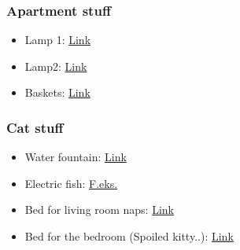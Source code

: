 \documentclass[a4paper,12pt]{article}
\begin{document}
\subsubsection*{Apartment stuff}
\begin{itemize}
		\item Lamp 1: \href{https://www.amazon.de/-/en/dp/B06XGC4VF3/?coliid=I6H4RCOZ197G3&colid=I0FEDY0421U1&psc=1&ref_=lv_ov_lig_dp_it&fbclid=IwAR24RCNj0vZ2K4CFiniVLbQ6P-MuHoh9wmFvzXI8M5NcRrYsdjoWFRuJbIg}{Link}
		\item Lamp2:  \href{https://www.amazon.de/-/en/dp/B07ML3DQ13/?coliid=I3D74LQJIHFMZ9&colid=I0FEDY0421U1&psc=1&ref_=lv_ov_lig_dp_it&fbclid=IwAR1Z52swpR9e4hBIBU0YJEnDChVSxL1xAadWj90BVkDkGgM3YDGkT8u4D8I}{Link}
		\item Baskets: \href{https://www.amazon.de/-/en/dp/B07C887FYQ/?coliid=I1R9F26MKG66DZ&colid=I0FEDY0421U1&psc=1&ref_=lv_ov_lig_dp_it&fbclid=IwAR2iJwflYhNP7ArrfmFkCBE4jmXyVngkHjY1MVM-lwtlgDz1-C3jtKEYKWE}{Link}
\end{itemize}
\subsubsection*{Cat stuff}
\begin{itemize} 
	\item Water fountain: \href{https://www.amazon.de/-/en/dp/B088GP66DG/?coliid=ILBPE0RYM73S2&colid=I0FEDY0421U1&psc=1&ref_=lv_ov_lig_dp_it&fbclid=IwAR3XrTXKZ4FO7VIMSmiuhd0-1DL80eMdKN8G57aCfAZQ3_TxDw8EgYpMGdU}{Link}
	\item Electric fish: \href{https://www.geekbuying.com/item/Electric-30cm-Plush-Fabric-Simulation-Fish-Grass-Carp-423961.html?Currency=DKK&source=googleads&la=en&dv=c&pt=&ty=pla&gclid=CjwKCAiA2O39BRBjEiwApB2IkuZ-R8wYx7bX_XmkkRS2GGBe0124WENMbZ2mcAy6MBl8c5SaTV1jyxoC4YQQAvD_BwE}{F.eks.}
	\item Bed for living room naps: \href{https://www.petsmart.com/cat/beds-and-furniture/cuddler-beds/petpals-round-basket-cat-bed-27431.html?cgid=200177}{Link}
	\item Bed for the bedroom (Spoiled kitty..): \href{https://www.petsmart.com/cat/beds-and-furniture/cuddler-beds/whisker-city-fur-donut-cuddler-cat-bed-58108.html?cgid=200177}{Link}
\end{itemize} 
\end{document}
